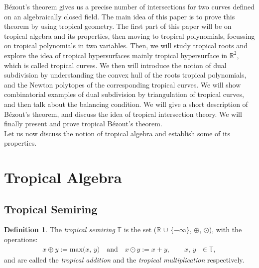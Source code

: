 \documentclass[]{article}
\theoremstyle{definition}
\numberwithin{equation}{section}
\newtheorem{defn}[thm]{Definition}
\newcommand{\R}{\mathbb{R}}
\renewcommand{\.}{\,.}
\begin{document}
\hspace*{3mm}B\'{e}zout's theorem gives us a precise number of intersections for two curves defined on an algebraically closed field. The main idea of this paper is to prove this theorem by using tropical geometry. The first part of this paper will be on tropical algebra and its properties, then moving to tropical polynomials, focussing on tropical polynomials in two variables. Then, we will study tropical roots and explore the idea of tropical hypersurfaces mainly tropical hypersurface in $\mathbb{R}^2$, which is called  tropical curves. We then will introduce the notion of dual subdivision by understanding the convex hull of the roots tropical polynomials, and the Newton polytopes of the  corresponding tropical curves. We will show  combinatorial examples of dual subdivision by triangulation of tropical curves, and then talk about the balancing condition. We will give a short description of B\'ezout's theorem, and discuss the idea of tropical intersection theory. We will finally present and prove tropical  B\'ezout's theorem. \\ 

\hspace*{3mm} Let us now discuss the notion of tropical algebra and establish some of its properties.
\newpage



\section{Tropical Algebra}
\subsection{Tropical Semiring} 

\begin{defn} The \emph{tropical semiring} $\mathbb{T}$  is the set ($\R$  $\cup$ $\{-\infty\}$, $\oplus$, $\odot$), with the operations: 
		\begin{align}
		x \oplus y := \textrm{max($x$, $y$)} \quad \textrm{and} \quad x \odot y := x + y,  \quad \quad \textrm{$x$, $y$ $\in \mathbb{T}$}, \label{fund1}
		\end{align}
and are called the \emph{tropical addition} and the \emph{tropical multiplication} respectively. 
\end{defn}
\end{document}
